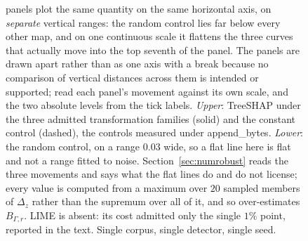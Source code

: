 \begin{figure}[t]
{panels plot the same quantity on the same horizontal axis, on \emph{separate}
vertical ranges: the random control lies far below every other map, and on one
continuous scale it flattens the three curves that actually move into the top
seventh of the panel. The panels are drawn apart rather than as one axis with a
break because no comparison of vertical distances across them is intended or
supported; read each panel's movement against its own scale, and the two
absolute levels from the tick labels. \emph{Upper}: TreeSHAP under the three
admitted transformation families (solid) and the constant control (dashed), the
controls measured under \textsf{append\_bytes}. \emph{Lower}: the random
control, on a range $0.03$ wide, so a flat line here is flat and not a range
fitted to noise. Section~\ref{sec:numrobust} reads the three movements and says
what the flat lines do and do not license; every value is computed from a maximum
over $20$ sampled members of $\Delta_z$ rather than the supremum over all of it,
and so over-estimates $B_{\Gamma,r}$. LIME
is absent: its cost admitted only the single $1\%$ point, reported in the text.
Single corpus, single detector, single seed.}
\label{fig:robustness}
\end{figure}

